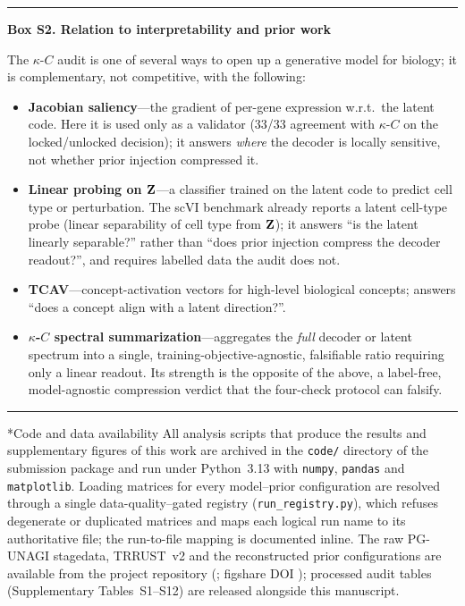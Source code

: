 \documentclass[11pt,a4paper]{article}
\makeatletter
\renewcommand{\section}{\@startsection{section}{1}{0pt}{12pt plus 6pt}{6pt}{\large\bfseries}}
\newenvironment{boxednote}[1]{%
  \par\medskip\noindent\begin{minipage}{\linewidth}%
    \hrule\smallskip\textbf{#1}\par\smallskip\small}{%
    \smallskip\hrule\end{minipage}\par\medskip}
\makeatother
\begin{document}
\begin{boxednote}{Box S2. Relation to interpretability and prior work}
The $\kappa$-$C$ audit is one of several ways to open up a generative model for biology; it is complementary, not competitive, with the following:
\begin{itemize}[leftmargin=1.2em]
\item \textbf{Jacobian saliency}---the gradient of per-gene expression w.r.t.\ the latent code. Here it is used only as a validator (33/33 agreement with $\kappa$-$C$ on the locked/unlocked decision); it answers \emph{where} the decoder is locally sensitive, not whether prior injection compressed it.
\item \textbf{Linear probing on $\mathbf{Z}$}---a classifier trained on the latent code to predict cell type or perturbation. The scVI benchmark already reports a latent cell-type probe (linear separability of cell type from $\mathbf{Z}$); it answers ``is the latent linearly separable?'' rather than ``does prior injection compress the decoder readout?'', and requires labelled data the audit does not.
\item \textbf{TCAV}---concept-activation vectors for high-level biological concepts; answers ``does a concept align with a latent direction?''.
\item \textbf{$\kappa$-$C$ spectral summarization}---aggregates the \emph{full} decoder or latent spectrum into a single, training-objective-agnostic, falsifiable ratio requiring only a linear readout. Its strength is the opposite of the above, a label-free, model-agnostic compression verdict that the four-check protocol can falsify.
\end{itemize}
\end{boxednote}

\section*{Code and data availability}
All analysis scripts that produce the results and supplementary figures of this work are archived
in the \texttt{code/} directory of the submission package and run under Python~3.13 with
\texttt{numpy}, \texttt{pandas} and \texttt{matplotlib}. Loading matrices for every
model--prior configuration are resolved through a single data-quality--gated registry
(\texttt{run\_registry.py}), which refuses degenerate or duplicated matrices and maps each logical
run name to its authoritative file; the run-to-file mapping is documented inline. The raw PG-UNAGI
stagedata, TRRUST~v2 and the reconstructed prior configurations are available from the project
repository (\RepositoryURL; figshare DOI \FigshareDOI); processed audit tables (Supplementary Tables~S1--S12) are released alongside this
manuscript.
\end{document}
